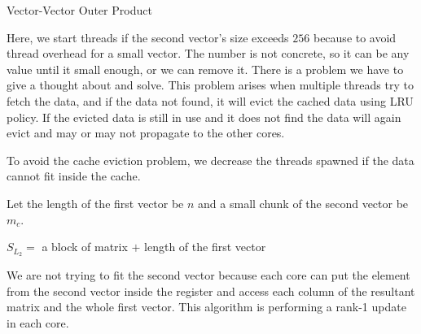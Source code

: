 \begin{algorithm}[H]
    \SetAlgoLined
    \caption{Vector-Vector Outer Product}
\end{algorithm}

Here, we start threads if the second vector's size exceeds $256$ because 
to avoid thread overhead for a small vector. The number is not concrete, 
so it can be any value until it small enough, or we can remove it. 
There is a problem we have to give a thought about and solve. 
This problem arises when multiple threads try to fetch the data, 
and if the data not found, it will evict the cached data using LRU policy. 
If the evicted data is still in use and it does not find the data will 
again evict and may or may not propagate to the other cores. 

To avoid the cache eviction problem, we decrease the threads spawned 
if the data cannot fit inside the cache.

Let the length of the first vector be $n$ and a small chunk of the second
vector be $m_c$.

$S_{L_2} = $ a block of matrix $+$ length of the first vector

We are not trying to fit the second vector because each core can 
put the element from the second vector inside the register and 
access each column of the resultant matrix and the whole first vector.
This algorithm is performing a rank-1 update in each core.

